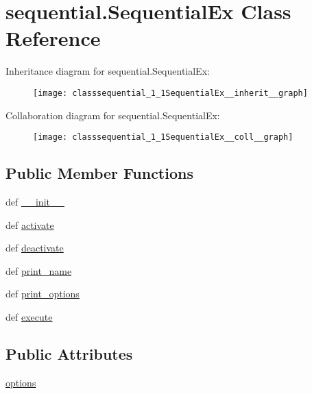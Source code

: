 \hypertarget{classsequential_1_1SequentialEx}{\section{sequential.\-Sequential\-Ex Class Reference}
\label{classsequential_1_1SequentialEx}
}


Inheritance diagram for sequential.\-Sequential\-Ex\-:
\nopagebreak
\begin{figure}[H]
\begin{center}
\leavevmode
\texttt{[image: classsequential\_1\_1SequentialEx\_\_inherit\_\_graph]}
\end{center}
\end{figure}


Collaboration diagram for sequential.\-Sequential\-Ex\-:
\nopagebreak
\begin{figure}[H]
\begin{center}
\leavevmode
\texttt{[image: classsequential\_1\_1SequentialEx\_\_coll\_\_graph]}
\end{center}
\end{figure}
\subsection*{Public Member Functions}
\begin{DoxyCompactItemize}
\item 
def \hyperlink{classsequential_1_1SequentialEx_aef3e664b94447607395ba443ef126600}{\-\_\-\-\_\-init\-\_\-\-\_\-}
\item 
def \hyperlink{classsequential_1_1SequentialEx_a0395a18b172a964a208b5d39e5e6e9cd}{activate}
\item 
def \hyperlink{classsequential_1_1SequentialEx_ad0324c90b6af183853dc5453341bc166}{deactivate}
\item 
def \hyperlink{classsequential_1_1SequentialEx_ab82c1f57be3191cc5440df41a989cb90}{print\-\_\-name}
\item 
def \hyperlink{classsequential_1_1SequentialEx_a1d154cd0643f05739b7f62d14fa3be2f}{print\-\_\-options}
\item 
def \hyperlink{classsequential_1_1SequentialEx_ad0371440bf0b65e8e59249d73d248cc7}{execute}
\end{DoxyCompactItemize}
\subsection*{Public Attributes}
\begin{DoxyCompactItemize}
\item 
\hyperlink{classsequential_1_1SequentialEx_a72ae94e2c46c2b1b8c5022eaf3593edf}{options}
\end{DoxyCompactItemize}



